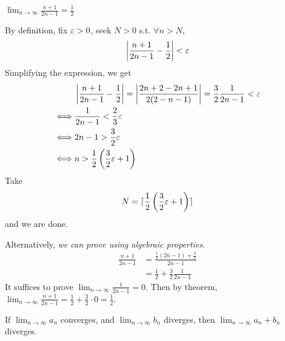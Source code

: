 \begin{example}
    $\lim_{n \to \infty} \frac{n + 1}{2n - 1} = \frac{1}{2}$ 
    \medskip

    By definition, fix $\varepsilon > 0$, seek $N > 0$ s.t. $\forall n > N$, 
    \[
        \left| 
            \frac{n+1}{2n-1} - \frac{1}{2}
        \right|  < \varepsilon
    \]
    Simplifying the expression, we get
    \begin{align*}
        & \left| 
            \frac{n+1}{2n-1} - \frac{1}{2}
        \right|  
        = \left| \frac{2n + 2 - 2n +1}{2(2-n-1)} \right| 
        = \frac{3}{2} \frac{1}{2n - 1} < \varepsilon \\
        \iff &  \frac{1}{2n - 1} < \frac{2}{3}\varepsilon \\
        \iff & 2n - 1 > \frac{3}{2} \varepsilon \\
        \iff & n > \frac{1}{2} \left( \frac{3}{2} \varepsilon  + 1 \right) 
    \end{align*}
    Take 
    \[
        N= 
        \lceil
        \frac{1}{2} \left( \frac{3}{2} \varepsilon + 1 \right)
        \rceil
    \]
    and we are done. 

    \medskip

    Alternatively, \textit{we can prove using algebraic properties}.
    \begin{align*}
        \frac{n + 1}{2n - 1} 
        &= \frac{ \frac{1}{2} (2n-1) + \frac{3}{2}}{2n - 1} \\
        &= \frac{1}{2} + \frac{3}{2} \frac{1}{2n -1}
    \end{align*}
    It suffices to prove $\lim_{n  \to \infty} \frac{1}{2n-1} = 0$.
    Then by theorem, $\lim_{n \to \infty} \frac{n + 1}{2n-1} = \frac{1}{2} + \frac{3}{2} \cdot 0 = \frac{1}{2}$.
\end{example}


\begin{corollary}
    If $\lim_{n \to \infty}a_n$ converges, and $\lim_{n \to \infty} b_n$ diverges,
    then $\lim_{n \to \infty}a_n + b_n$ diverges.
\end{corollary}

